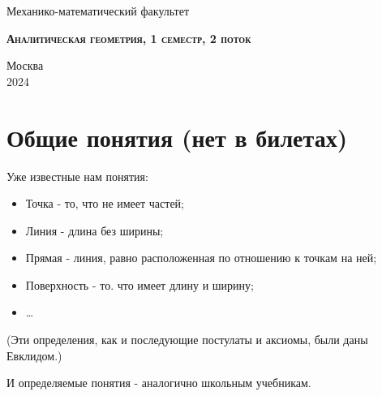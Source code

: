 \documentclass[a4paper, 12pt]{article}
\theoremstyle{definition}
\begin{document}
	\begin{titlepage}
		\newpage
		
		\begin{center}
		\end{center}
		
		\vspace{4em}
		
		\begin{center}
			\Large Механико-математический факультет  
		\end{center}
		
		\vspace{2em}
		
		\begin{center}
			\large{\textsc{\textbf{Аналитическая геометрия, 1 семестр, 2 поток}}}
		\end{center}
		
		\vspace{6em}
		
		\vspace{\fill}
		
		\begin{center}
			Москва \\2024 
		\end{center}
	\end{titlepage}
	\tableofcontents
	\fontsize{14pt}{20pt}\selectfont
	\newpage
	\fontsize{14pt}{20pt}\selectfont
	\section{Общие понятия (нет в билетах)}
	Уже известные нам понятия:
	\begin{itemize}
	\item Точка - то, что не имеет частей;
	\item Линия - длина без ширины;
	\item Прямая - линия, равно расположенная по отношению к точкам на ней;
	\item Поверхность - то. что имеет длину и ширину;
	\item \dots
	\end{itemize}
	(Эти определения, как и последующие постулаты и аксиомы, были даны Евклидом.)
	
	И определяемые понятия - аналогично школьным учебникам. 
\end{document}
